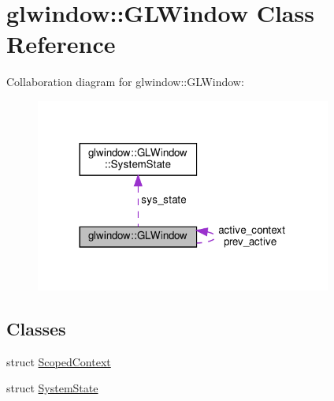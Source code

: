 \hypertarget{classglwindow_1_1_g_l_window}{}\section{glwindow\+:\+:G\+L\+Window Class Reference}
\label{classglwindow_1_1_g_l_window}


Collaboration diagram for glwindow\+:\+:G\+L\+Window\+:
\nopagebreak
\begin{figure}[H]
\begin{center}
\leavevmode
\includegraphics[width=276pt]{classglwindow_1_1_g_l_window__coll__graph}
\end{center}
\end{figure}
\subsection*{Classes}
\begin{DoxyCompactItemize}
\item 
struct \hyperlink{structglwindow_1_1_g_l_window_1_1_scoped_context}{Scoped\+Context}
\item 
struct \hyperlink{struct_g_l_window_1_1_system_state}{System\+State}
\end{DoxyCompactItemize}
